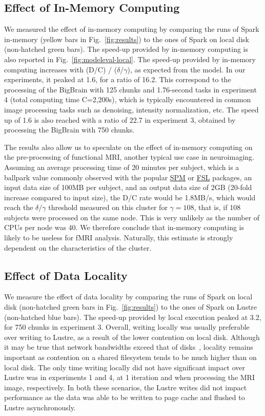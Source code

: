 \documentclass{IEEEtran}
\begin{document}
\subsection{Effect of In-Memory Computing}
We measured the effect of in-memory computing by comparing the runs 
of Spark in-memory (yellow bars in Fig.~\ref{fig:results}) to the ones 
of Spark on local disk (non-hatched green bars). The speed-up provided 
by in-memory computing is also reported in 
Fig.~\ref{fig:modeleval-local}. The speed-up provided by in-memory 
computing increases with (D/C) / ($\delta$/$\gamma$), as expected from 
the model. In our experiments, it peaked at 1.6, for a ratio of 16.2. 
This correspond to the processing of the BigBrain with 125 chunks and 
1.76-second tasks in experiment 4 (total computing time C=2,200s), 
which is typically encountered in common image processing tasks such as 
denoising, intensity normalization, etc. The speed up of 1.6 is also 
reached with a ratio of 22.7 in experiment 3, obtained by processing 
the BigBrain with 750 chunks.

The results also allow us to speculate on the effect of in-memory 
computing on the pre-processing of functional MRI, another typical use 
case in neuroimaging. Assuming an average processing time of 20 minutes 
per subject, which is a ballpark value commonly observed with the 
popular \href{https://www.fil.ion.ucl.ac.uk/spm/}{SPM} or \href{https://fsl.fmrib.ox.ac.uk/fsl/fslwiki/}{FSL} packages,
an input data size of 100MB per subject, 
and an output data size of 2GB (20-fold increase compared to input 
size), the D/C rate would be 1.8MB/s, which would reach the 
$\delta/\gamma$ threshold measured on this cluster for $\gamma=108$, 
that is, if 108 subjects were processed on the same node. This is very 
unlikely as the number of CPUs per node was 40. We therefore conclude 
that in-memory computing is likely to be useless for fMRI analysis.
Naturally, this estimate is strongly dependent on the characteristics of the cluster.

\subsection{Effect of Data Locality}

We measure the effect of data locality by comparing the runs of Spark
on local disk (non-hatched green bars in Fig.~\ref{fig:results}) to the 
ones of Spark on Lustre (non-hatched blue bars). The speed-up provided by 
local execution peaked at 3.2, for 750 chunks in experiment 3. Overall, 
writing locally was usually preferable over writing to Lustre, as a result of the
lower contention on local disk. Although it may be true that
network bandwidths exceed that of disks~\cite{ananthanarayanan2011disk},
locality remains important 
as contention on a shared filesystem tends to be much higher than on local disk.
The only time writing locally did not
have significant impact over Lustre was in experiments 1 and 4, at 1 iteration and 
when processing the MRI image, respectively. In both these scenarios, the Lustre 
writes did not impact performance as the data was able to be written to page cache
and flushed to Lustre asynchronously.
\end{document}
